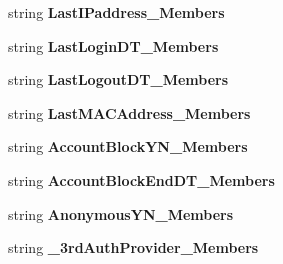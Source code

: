 \begin{DoxyCompactItemize}
\item 
string {\bfseries Last\+I\+Paddress\+\_\+\+Members}\hypertarget{a00101_a49827e6f292d5bdd1b09f034dac7ab49}{}\label{a00101_a49827e6f292d5bdd1b09f034dac7ab49}

\item 
string {\bfseries Last\+Login\+D\+T\+\_\+\+Members}\hypertarget{a00101_a8b94d6ab4a2d518dc05b03302f0656a9}{}\label{a00101_a8b94d6ab4a2d518dc05b03302f0656a9}

\item 
string {\bfseries Last\+Logout\+D\+T\+\_\+\+Members}\hypertarget{a00101_adcf64033f2adee9765e9ab08c191bc52}{}\label{a00101_adcf64033f2adee9765e9ab08c191bc52}

\item 
string {\bfseries Last\+M\+A\+C\+Address\+\_\+\+Members}\hypertarget{a00101_abf645cb8ed6f14f269925ea1824783c6}{}\label{a00101_abf645cb8ed6f14f269925ea1824783c6}

\item 
string {\bfseries Account\+Block\+Y\+N\+\_\+\+Members}\hypertarget{a00101_aead0cbf3a1bc460d9aa9fe375ffbf13a}{}\label{a00101_aead0cbf3a1bc460d9aa9fe375ffbf13a}

\item 
string {\bfseries Account\+Block\+End\+D\+T\+\_\+\+Members}\hypertarget{a00101_a8a4ce43293d81ffd01869f0d484887c0}{}\label{a00101_a8a4ce43293d81ffd01869f0d484887c0}

\item 
string {\bfseries Anonymous\+Y\+N\+\_\+\+Members}\hypertarget{a00101_ae8b674abaae4dc5add692c1ecb97acd8}{}\label{a00101_ae8b674abaae4dc5add692c1ecb97acd8}

\item 
string {\bfseries \+\_\+3rd\+Auth\+Provider\+\_\+\+Members}\hypertarget{a00101_a4b0c07063050349af484e429ed440ab9}{}\label{a00101_a4b0c07063050349af484e429ed440ab9}


\end{DoxyCompactItemize}

